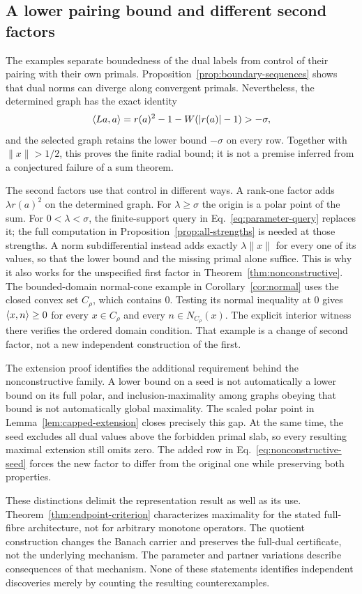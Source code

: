 \subsection{A lower pairing bound and different second factors}
The examples separate boundedness of the dual labels from control of
their pairing with their own primals. Proposition~\ref{prop:boundary-sequences}
shows that dual norms can diverge along convergent primals. Nevertheless,
the determined graph has the exact identity
\[
\langle La,a\rangle=r(a)^2-1-W(|r(a)|-1)>-\sigma,
\]
and the selected graph retains the lower bound $-\sigma$ on every row.
Together with $\|x\|>1/2$, this proves the finite radial bound; it is
not a premise inferred from a conjectured failure of a sum theorem.

The second factors use that control in different ways. A rank-one factor
adds $\lambda r(a)^2$ on the determined graph. For $\lambda\ge\sigma$
the origin is a polar point of the sum. For $0<\lambda<\sigma$, the
finite-support query in Eq.~\eqref{eq:parameter-query} replaces it;
the full computation in Proposition~\ref{prop:all-strengths} is needed
at those strengths. A norm subdifferential instead adds exactly
$\lambda\|x\|$ for every one of its values, so that the lower bound
and the missing primal alone suffice. This is why it also works for
the unspecified first factor in Theorem~\ref{thm:nonconstructive}.
\ifdefined\expandedversion
The bounded-domain normal-cone example in Corollary~\ref{cor:normal}
uses the closed convex set $C_\rho$, which contains $0$. Testing its
normal inequality at $0$ gives $\langle x,n\rangle\ge0$ for every
$x\in C_\rho$ and every $n\in N_{C_\rho}(x)$. The explicit interior
witness there verifies the ordered domain condition. That example is a change
of second factor, not a new independent construction of the first.
\fi

The extension proof identifies the additional requirement behind the
nonconstructive family. A lower bound on a seed is not automatically a
lower bound on its full polar, and inclusion-maximality among graphs
obeying that bound is not automatically global maximality. The scaled
polar point in Lemma~\ref{lem:capped-extension} closes precisely this
gap. At the same time, the seed excludes all dual values above the
forbidden primal slab, so every resulting maximal extension still omits
zero. The added row in Eq.~\eqref{eq:nonconstructive-seed} forces the
new factor to differ from the original one while preserving both
properties.

These distinctions delimit the representation result as well as its
use. Theorem~\ref{thm:endpoint-criterion} characterizes maximality for
the stated full-fibre architecture, not for arbitrary monotone operators.
The quotient construction changes the Banach carrier and preserves the
full-dual certificate, not the underlying mechanism. The parameter and
partner variations describe consequences of that mechanism. None of
these statements identifies independent discoveries merely by counting
the resulting counterexamples.
